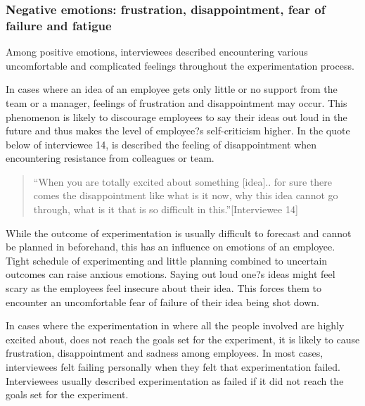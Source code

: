 \subsubsection{Negative emotions: frustration, disappointment, fear of failure and fatigue}
Among positive emotions, interviewees described encountering various uncomfortable and complicated feelings throughout the experimentation process. 

In cases where an idea of an employee gets only little or no support from the team or a manager, feelings of frustration and disappointment may occur. This phenomenon is likely to discourage employees to say their ideas out loud in the future and thus makes the level of employee?s self-criticism higher. In the quote below of interviewee 14, is described the feeling of disappointment when encountering resistance from colleagues or team.
\begin{quote}
``When you are totally excited about something [idea].. for sure there comes the disappointment like what is it now, why this idea cannot go through, what is it that is so difficult in this.''[Interviewee 14]
\end{quote}
While the outcome of experimentation is usually difficult to forecast and cannot be planned in beforehand, this has an influence on emotions of an employee. Tight schedule of experimenting and little planning combined to uncertain outcomes can raise anxious emotions. Saying out loud one?s ideas might feel scary as the employees feel insecure about their idea. This forces them to encounter an uncomfortable fear of failure of their idea being shot down. 

In cases where the experimentation in where all the people involved are highly excited about, does not reach the goals set for the experiment, it is likely to cause frustration, disappointment and sadness among employees. In most cases, interviewees felt failing personally when they felt that experimentation failed. Interviewees usually described experimentation as failed if it did not reach the goals set for the experiment. 

